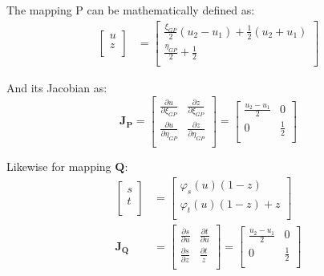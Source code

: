 \documentclass[12pt, a4paper]{report}
\begin{document}
The mapping P can be mathematically defined as:
\begin{align}
    \begin{bmatrix}
    u \\
    z \\
  \end{bmatrix}
  &=
  \begin{bmatrix}
    \frac{\xi_{GP}}{2}(u_2-u_1) + \frac{1}{2}(u_2+u_1) \\
    \frac{\eta_{GP}}{2} + \frac{1}{2} \\
  \end{bmatrix}
\end{align}

And its Jacobian as:
\begin{equation}
  \boldsymbol{J_P}= \begin{bmatrix}    \frac{\partial u}{\partial \xi_{GP}}& \frac{\partial z}{\partial \xi_{GP}} \\
\frac{\partial u}{\partial \eta_{GP}} &\frac{\partial z}{\partial \eta_{GP}} \\\end{bmatrix}=\begin{bmatrix}    \frac{u_2-u_1}{2}& 0 \\
 0 & \frac{1}{2} \\\end{bmatrix}
\end{equation}

Likewise for mapping $\boldsymbol{Q}$:
\begin{align}
  \begin{bmatrix}
    s \\
    t \\
  \end{bmatrix}
  &=
  \begin{bmatrix}
    \varphi_s(u)(1-z) \\
    \varphi_t(u)(1-z) + z \\
  \end{bmatrix} \\
  \boldsymbol{J_Q} &=
  \begin{bmatrix}
    \frac{\partial s}{\partial u} & \frac{\partial t}{\partial u} \\
    \frac{\partial s}{\partial z} & \frac{\partial t}{z} \\
  \end{bmatrix} =
  \begin{bmatrix}
    \frac{u_2 - u_1}{2} & 0 \\
    0 & \frac{1}{2} \\
  \end{bmatrix}
\end{align}
\end{document}
